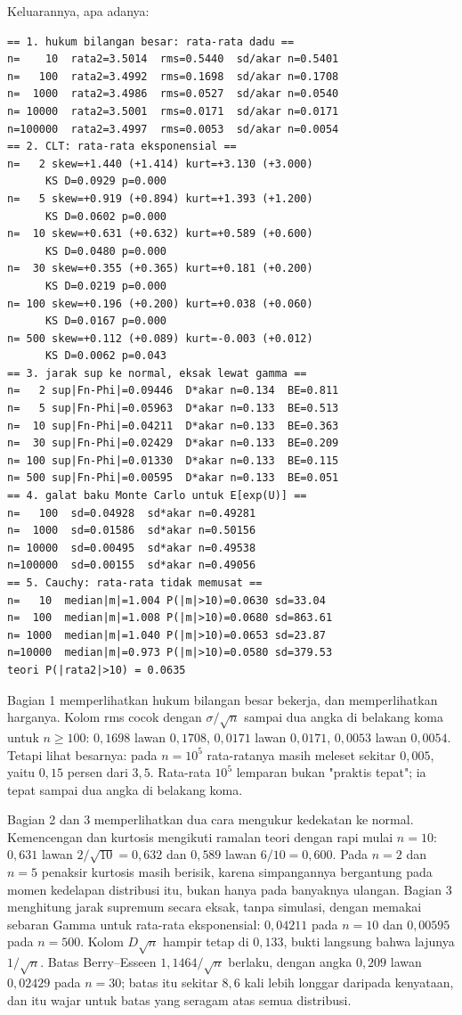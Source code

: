 Keluarannya, apa adanya:

\begin{verbatim}
== 1. hukum bilangan besar: rata-rata dadu ==
n=    10  rata2=3.5014  rms=0.5440  sd/akar n=0.5401
n=   100  rata2=3.4992  rms=0.1698  sd/akar n=0.1708
n=  1000  rata2=3.4986  rms=0.0527  sd/akar n=0.0540
n= 10000  rata2=3.5001  rms=0.0171  sd/akar n=0.0171
n=100000  rata2=3.4997  rms=0.0053  sd/akar n=0.0054
== 2. CLT: rata-rata eksponensial ==
n=   2 skew=+1.440 (+1.414) kurt=+3.130 (+3.000)
      KS D=0.0929 p=0.000
n=   5 skew=+0.919 (+0.894) kurt=+1.393 (+1.200)
      KS D=0.0602 p=0.000
n=  10 skew=+0.631 (+0.632) kurt=+0.589 (+0.600)
      KS D=0.0480 p=0.000
n=  30 skew=+0.355 (+0.365) kurt=+0.181 (+0.200)
      KS D=0.0219 p=0.000
n= 100 skew=+0.196 (+0.200) kurt=+0.038 (+0.060)
      KS D=0.0167 p=0.000
n= 500 skew=+0.112 (+0.089) kurt=-0.003 (+0.012)
      KS D=0.0062 p=0.043
== 3. jarak sup ke normal, eksak lewat gamma ==
n=   2 sup|Fn-Phi|=0.09446  D*akar n=0.134  BE=0.811
n=   5 sup|Fn-Phi|=0.05963  D*akar n=0.133  BE=0.513
n=  10 sup|Fn-Phi|=0.04211  D*akar n=0.133  BE=0.363
n=  30 sup|Fn-Phi|=0.02429  D*akar n=0.133  BE=0.209
n= 100 sup|Fn-Phi|=0.01330  D*akar n=0.133  BE=0.115
n= 500 sup|Fn-Phi|=0.00595  D*akar n=0.133  BE=0.051
== 4. galat baku Monte Carlo untuk E[exp(U)] ==
n=   100  sd=0.04928  sd*akar n=0.49281
n=  1000  sd=0.01586  sd*akar n=0.50156
n= 10000  sd=0.00495  sd*akar n=0.49538
n=100000  sd=0.00155  sd*akar n=0.49056
== 5. Cauchy: rata-rata tidak memusat ==
n=   10  median|m|=1.004 P(|m|>10)=0.0630 sd=33.04
n=  100  median|m|=1.008 P(|m|>10)=0.0680 sd=863.61
n= 1000  median|m|=1.040 P(|m|>10)=0.0653 sd=23.87
n=10000  median|m|=0.973 P(|m|>10)=0.0580 sd=379.53
teori P(|rata2|>10) = 0.0635
\end{verbatim}

Bagian 1 memperlihatkan hukum bilangan besar bekerja, dan memperlihatkan
harganya. Kolom rms cocok dengan $\sigma/\sqrt n$ sampai dua angka di belakang
koma untuk $n\ge100$: $0{,}1698$ lawan $0{,}1708$, $0{,}0171$ lawan $0{,}0171$,
$0{,}0053$ lawan $0{,}0054$. Tetapi lihat besarnya: pada $n=10^5$ rata-ratanya
masih meleset sekitar $0{,}005$, yaitu $0{,}15$ persen dari $3{,}5$. Rata-rata
$10^5$ lemparan bukan "praktis tepat"; ia tepat sampai dua angka di belakang
koma.

Bagian 2 dan 3 memperlihatkan dua cara mengukur kedekatan ke normal. Kemencengan
dan kurtosis mengikuti ramalan teori dengan rapi mulai $n=10$: $0{,}631$ lawan
$2/\sqrt{10}=0{,}632$ dan $0{,}589$ lawan $6/10=0{,}600$. Pada $n=2$ dan $n=5$
penaksir kurtosis masih berisik, karena simpangannya bergantung pada momen
kedelapan distribusi itu, bukan hanya pada banyaknya ulangan. Bagian 3 menghitung
jarak supremum secara eksak, tanpa simulasi, dengan memakai sebaran Gamma untuk
rata-rata eksponensial: $0{,}04211$ pada $n=10$ dan $0{,}00595$ pada $n=500$.
Kolom $D\sqrt n$ hampir tetap di $0{,}133$, bukti langsung bahwa lajunya
$1/\sqrt n$. Batas Berry--Esseen $1{,}1464/\sqrt n$ berlaku, dengan angka
$0{,}209$ lawan $0{,}02429$ pada $n=30$; batas itu sekitar $8{,}6$ kali lebih
longgar daripada kenyataan, dan itu wajar untuk batas yang seragam atas semua
distribusi.

